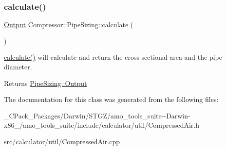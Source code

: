 \subsubsection{\texorpdfstring{calculate()}{calculate()}\hspace{0.1cm}{\footnotesize\ttfamily [3/3]}}
{\footnotesize\ttfamily \hyperlink{struct_compressor_1_1_pipe_sizing_1_1_output}{Output} Compressor\+::\+Pipe\+Sizing\+::calculate (\begin{DoxyParamCaption}{ }\end{DoxyParamCaption})}

\hyperlink{class_compressor_1_1_pipe_sizing_a9212c8d52ff658c412752cee18d6b28d}{calculate()} will calculate and return the cross sectional area and the pipe diameter. \begin{DoxyReturn}{Returns}
\hyperlink{struct_compressor_1_1_pipe_sizing_1_1_output}{Pipe\+Sizing\+::\+Output} 
\end{DoxyReturn}


The documentation for this class was generated from the following files\+:\begin{DoxyCompactItemize}
\item 
\+\_\+\+C\+Pack\+\_\+\+Packages/\+Darwin/\+S\+T\+G\+Z/amo\+\_\+tools\+\_\+suite-\/-\/\+Darwin-\/x86\+\_/amo\+\_\+tools\+\_\+suite/include/calculator/util/Compressed\+Air.\+h\item 
src/calculator/util/Compressed\+Air.\+cpp\end{DoxyCompactItemize}
